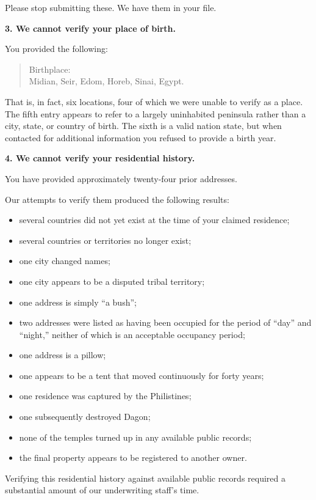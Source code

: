 {{Please stop submitting these. We have them in your file.

\textbf{3. We cannot verify your place of birth.}

You provided the following:

\begin{quote}
Birthplace:\\Midian, Seir, Edom, Horeb, Sinai, Egypt.
\end{quote}

That is, in fact, six locations, four of which we were unable to verify as a place. The fifth entry appears to refer to a largely uninhabited peninsula rather than a city, state, or country of birth. The sixth is a valid nation state, but when contacted for additional information you refused to provide a birth year.

\textbf{4. We cannot verify your residential history.}

You have provided approximately twenty-four prior addresses.

Our attempts to verify them produced the following results:

\begin{itemize}
\item several countries did not yet exist at the time of your claimed residence;
\item several countries or territories no longer exist;
\item one city changed names;
\item one city appears to be a disputed tribal territory;
\item one address is simply ``a bush'';
\item two addresses were listed as having been occupied for the period of ``day'' and ``night,'' neither of which is an acceptable occupancy period;
\item one address is a pillow;
\item one appears to be a tent that moved continuously for forty years;
\item one residence was captured by the Philistines;
\item one subsequently destroyed Dagon;
\item none of the temples turned up in any available public records;
\item the final property appears to be registered to another owner.
\end{itemize}

Verifying this residential history against available public records required a substantial amount of our underwriting staff's time.

}}

